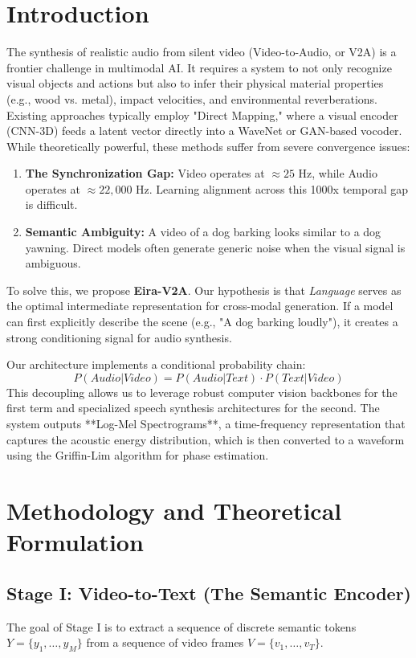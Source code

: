 \documentclass[conference, onecolumn]{IEEEtran}
\begin{document}
\section{Introduction}
The synthesis of realistic audio from silent video (Video-to-Audio, or V2A) is a frontier challenge in multimodal AI. It requires a system to not only recognize visual objects and actions but also to infer their physical material properties (e.g., wood vs. metal), impact velocities, and environmental reverberations.
Existing approaches typically employ "Direct Mapping," where a visual encoder (CNN-3D) feeds a latent vector directly into a WaveNet or GAN-based vocoder. While theoretically powerful, these methods suffer from severe convergence issues:
\begin{enumerate}
    \item \textbf{The Synchronization Gap:} Video operates at $\approx 25$ Hz, while Audio operates at $\approx 22,000$ Hz. Learning alignment across this 1000x temporal gap is difficult.
    \item \textbf{Semantic Ambiguity:} A video of a dog barking looks similar to a dog yawning. Direct models often generate generic noise when the visual signal is ambiguous.
\end{enumerate}

To solve this, we propose \textbf{Eira-V2A}. Our hypothesis is that \textit{Language} serves as the optimal intermediate representation for cross-modal generation. If a model can first explicitly describe the scene (e.g., "A dog barking loudly"), it creates a strong conditioning signal for audio synthesis.

Our architecture implements a conditional probability chain:
\[
P(Audio | Video) = P(Audio | Text) \cdot P(Text | Video)
\]
This decoupling allows us to leverage robust computer vision backbones for the first term and specialized speech synthesis architectures for the second. The system outputs **Log-Mel Spectrograms**, a time-frequency representation that captures the acoustic energy distribution, which is then converted to a waveform using the Griffin-Lim algorithm for phase estimation.

\section{Methodology and Theoretical Formulation}

\subsection{Stage I: Video-to-Text (The Semantic Encoder)}
The goal of Stage I is to extract a sequence of discrete semantic tokens $Y = \{y_1, \dots, y_M\}$ from a sequence of video frames $V = \{v_1, \dots, v_T\}$.
\end{document}
